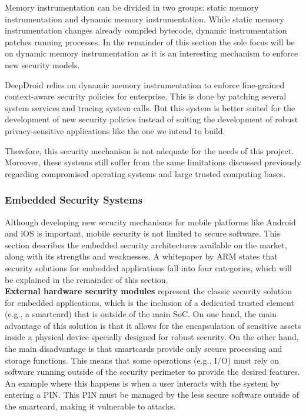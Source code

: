 Memory instrumentation can be divided in two groups: static memory instrumentation and dynamic memory instrumentation. While static memory instrumentation changes already compiled bytecode, dynamic instrumentation patches running processes. In the remainder of this section the sole focus will be on dynamic memory instrumentation as it is an interesting mechanism to enforce new security models.

DeepDroid \cite{wang2015deepdroid} relies on dynamic memory instrumentation to enforce fine-grained context-aware security policies for enterprise. This is done by patching several system services and tracing system calls. But this system is better suited for the development of new security policies instead of suiting the development of robust privacy-sensitive applications like the one we intend to build.

Therefore, this security mechanism is not adequate for the needs of this project. Moreover, these systems still suffer from the same limitations discussed previously regarding compromised operating systems and large trusted computing bases. 

\subsubsection{Embedded Security Systems}

Although developing new security mechanisms for mobile platforms like Android and iOS is important, mobile security is not limited to secure software. This section describes the embedded security architectures available on the market, along with its strengths and weaknesses. A whitepaper \cite{trustzone_whitepaper} by \ac{ARM} states that security solutions for embedded applications fall into four categories, which will be explained in the remainder of this section.\\

\textbf{External hardware security modules} represent the classic security solution for embedded applications, which is the inclusion of a dedicated trusted element (e.g., a smartcard) that is outside of the main \ac{SoC}. On one hand, the main advantage of this solution is that it allows for the encapsulation of sensitive assets inside a physical device specially designed for robust security. On the other hand, the main disadvantage is that smartcards provide only secure processing and storage functions. This means that some operations (e.g., I/O) must rely on software running outside of the security perimeter to provide the desired features. An example where this happens is when a user interacts with the system by entering a \ac{PIN}. This \ac{PIN} must be managed by the less secure software outside of the smartcard, making it vulnerable to attacks.\\

